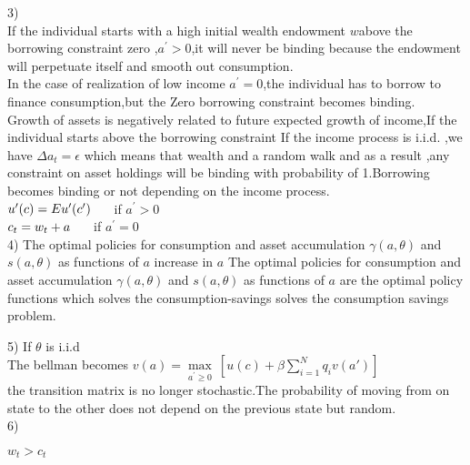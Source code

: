 \documentclass[11pt]{article}
\begin{document}
 3)\\
 
 If the individual starts  with a high initial wealth endowment $w$above the 
 borrowing constraint zero ,$a^{\prime}>0$,it will never be binding because the endowment 
 will perpetuate itself and smooth out consumption.\\
 In the case of realization of low income $a^{\prime}=0$,the individual has to 
 borrow to finance consumption,but the Zero borrowing constraint becomes 
 binding.\\
 Growth of assets is negatively related to future expected growth of income,If 
 the individual starts above the borrowing constraint
 If the income process is  i.i.d. ,we have $\Delta a_{t}=\epsilon$  which means  that  
 wealth  and a random walk and as a result ,any constraint on asset holdings 
 will be binding with probability of 1.Borrowing becomes binding or not 
 depending on the income process.\\
 
 $u^{\prime}(c)=Eu^{\prime}(c^{\prime}) \hspace{5mm}$ if $a^{\prime}>0$\\
                
   $c_{t}=w_{t}+a \hspace{5mm}$ if $a^{\prime}=0$\\             
                
4)   The optimal policies for consumption and asset accumulation $\gamma(a,\theta)$     and $s(a,\theta)$
    as functions of $a$ increase in $a$         
    The optimal policies for consumption and asset accumulation $\gamma(a,\theta)$     and $s(a,\theta)$
    as functions of $a$ are the optimal policy functions which solves the consumption-savings solves the 
    consumption savings problem.
           
 5)
 If $\theta$ is i.i.d\\
 The bellman becomes 
       $v(a)=\max  \limits_{a^{\prime} \geq 0} \ [ u(c)+\beta\sum_{i=1}^{N} q_{i}v(a\prime 
)]$\\       
              
  the transition matrix is no longer stochastic.The probability of moving from on state to the other does not depend on the
  previous state but random.\\            
              
              
6)

$w_{t}>c_{t}$
                           
\end{document}
